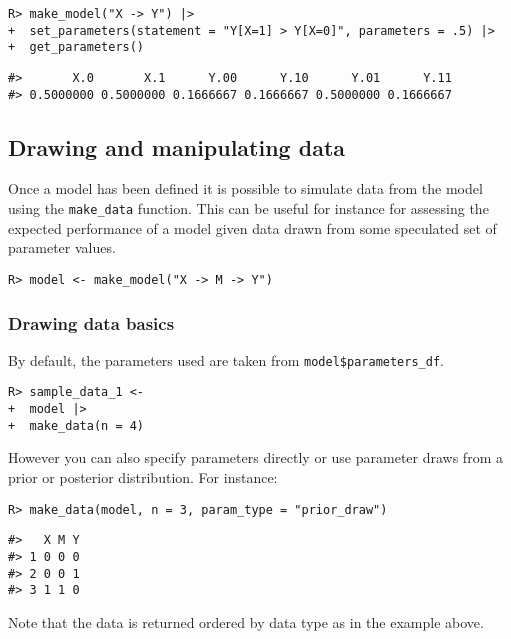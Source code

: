\documentclass[
  11pt,
  article]{jss}
\begin{document}
\begin{verbatim}
R> make_model("X -> Y") |>
+  set_parameters(statement = "Y[X=1] > Y[X=0]", parameters = .5) |>
+  get_parameters()
\end{verbatim}

\begin{verbatim}
#>       X.0       X.1      Y.00      Y.10      Y.01      Y.11 
#> 0.5000000 0.5000000 0.1666667 0.1666667 0.5000000 0.1666667
\end{verbatim}

\hypertarget{drawing-and-manipulating-data}{%
\subsection{Drawing and manipulating
data}\label{drawing-and-manipulating-data}}

Once a model has been defined it is possible to simulate data from the
model using the \texttt{make\_data} function. This can be useful for
instance for assessing the expected performance of a model given data
drawn from some speculated set of parameter values.

\begin{verbatim}
R> model <- make_model("X -> M -> Y") 
\end{verbatim}

\hypertarget{drawing-data-basics}{%
\subsubsection{Drawing data basics}\label{drawing-data-basics}}

By default, the parameters used are taken from
\texttt{model\$parameters\_df}.

\begin{verbatim}
R> sample_data_1 <- 
+  model |> 
+  make_data(n = 4)
\end{verbatim}

However you can also specify parameters directly or use parameter draws
from a prior or posterior distribution. For instance:

\begin{verbatim}
R> make_data(model, n = 3, param_type = "prior_draw")
\end{verbatim}

\begin{verbatim}
#>   X M Y
#> 1 0 0 0
#> 2 0 0 1
#> 3 1 1 0
\end{verbatim}

Note that the data is returned ordered by data type as in the example
above.
\end{document}
